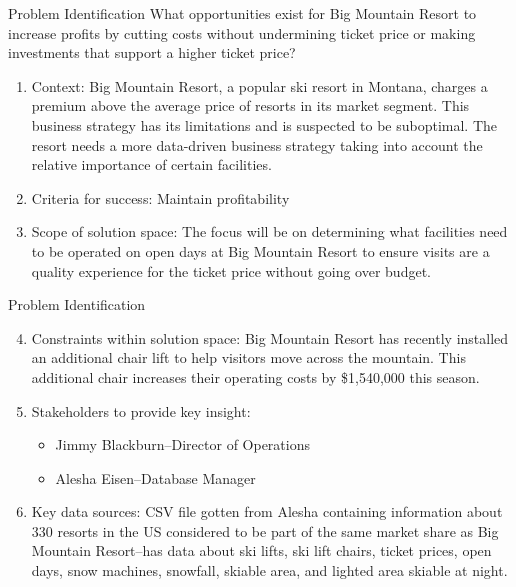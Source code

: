 \documentclass{beamer}
\begin{document}
\begin{frame}{Problem Identification}
What opportunities exist for Big Mountain Resort to increase profits by cutting costs without undermining ticket price or making investments that support a
higher ticket price?
\begin{enumerate}
\item Context: 
Big Mountain Resort, a popular ski resort in Montana, charges a premium
above the average price of resorts in its market segment. This business
strategy has its limitations and is suspected to be suboptimal.
The resort needs a more data-driven business strategy taking into account
the relative importance of certain facilities.
\item Criteria for success: Maintain profitability
\item Scope of solution space: The focus will be on determining what
facilities need to be operated on open days at Big Mountain Resort to
ensure visits are a quality experience for the ticket price without going
over budget.
\end{enumerate}
\end{frame}

\begin{frame}{Problem Identification}
\begin{enumerate}
\setcounter{enumi}{3}
\item Constraints within solution space:
Big Mountain Resort has recently installed an additional chair lift to
help visitors move across the mountain. This additional chair increases
their operating costs by \$1,540,000 this season.
\item Stakeholders to provide key insight:
\begin{itemize}
\item Jimmy Blackburn--Director of Operations
\item Alesha Eisen--Database Manager
\end{itemize}
\item Key data sources:
CSV file gotten from Alesha containing information about 330 resorts
in the US considered to be part of the same market share as Big Mountain
Resort--has data about ski lifts, ski lift chairs, ticket prices,
open days, snow machines, snowfall, skiable area, and lighted area skiable
at night.
\end{enumerate}
\end{frame}
\end{document}
